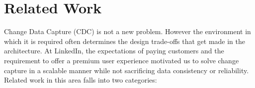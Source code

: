\section{Related Work}

Change Data Capture (CDC) is not a new problem. However the environment in which it is required often determines the design trade-offs that get made in the architecture.
At LinkedIn, the expectations of paying customers and the requirement to offer a premium user experience motivated us to solve change capture in a scalable manner while not sacrificing data consistency or reliability. Related work in this area falls into two categories:

